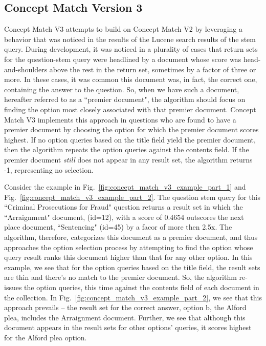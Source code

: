 \subsection{Concept Match Version 3}

Concept Match V3 attempts to build on Concept Match V2 by leveraging a behavior that was noticed in the results of the Lucene search results of the stem query.  
During development, it was noticed in a plurality of cases that return sets for the question-stem query were headlined by a document whose score was head-and-shoulders above the rest in the return set, sometimes by a factor of three or more.  In these cases, it was common this document was, in fact, the correct one, containing the answer to the question.  So, when we have such a document, hereafter referred to as a ``premier document", the algorithm should focus on finding the option most closely associated with that premier document.  Concept Match V3 implements this approach in questions who are found to have a premier document by choosing the option for which the premier document scores highest.  If no option queries based on the title field yield the premier document, then the algorithm repeats the option queries against the contents field.  If the premier document \emph{still} does not appear in any result set, the algorithm returns -1, representing no selection.

Consider the example in Fig.~\ref{fig:concept_match_v3_example_part_1} and Fig.~\ref{fig:concept_match_v3_example_part_2}.  The question stem query for this ``Criminal Prosecutions for Fraud" question returns a result set in which the ``Arraignment" document, (id=12), with a score of 0.4654 outscores the next place document, ``Sentencing" (id=45) by a facor of more then 2.5x.  The algorithm, therefore,  categorizes this document as a premier document, and thus approaches the option selection process by attempting to find the option whose query result ranks this document higher than that for any other option.  In this example, we see that for the option queries based on the title field, the result sets are thin and there's no match to the premier document.  So, the algorithm re-issues the option queries, this time against the contents field of each document in the collection.  In Fig.~\ref{fig:concept_match_v3_example_part_2}, we see that this approach prevails -- the result set for the correct answer, option b, the Alford plea, includes the Arraignment document.  Further, we see that although this document appears in the result sets for other options' queries, it scores highest for the Alford plea option.

